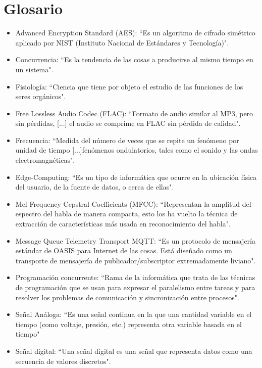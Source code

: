 \chapter{Glosario}
\begin{itemize}
    \item Advanced Encryption Standard (AES): ``Es un algoritmo de cifrado simétrico aplicado por NIST (Instituto Nacional de Estándares y Tecnología)"\cite{RFC3826}.
    \item Concurrencia: ``Es la tendencia de las cosas a producirse al mismo tiempo en un sistema"\cite{contconcurrency}.
    \item Fisiología: ``Ciencia que tiene por objeto el estudio de las funciones de los seres orgánicos"\cite{rae_2020}.
    \item Free Lossless Audio Codec (FLAC): ``Formato de audio similar al MP3, pero sin pérdidas, [...] el audio se comprime en FLAC sin pérdida de calidad"\cite{flac}.
    \item Frecuencia: ``Medida del número de veces que se repite un fenómeno por unidad de tiempo [...]fenómenos ondulatorios, tales como el sonido y las ondas electromagnéticas"\cite{euFrecuencia}.
    \item Edge-Computing: ``Es un tipo de informática que ocurre en la ubicación física del usuario, de la fuente de datos, o cerca de ellas"\cite{redHatEC2020}.
    \item Mel Frequency Cepstral Coefficients (MFCC): ``Representan la amplitud del espectro del habla de manera compacta, esto los ha vuelto la técnica de extracción de características más usada en reconocimiento del habla"\cite{MFCC}.
    \item Message Queue Telemetry Transport MQTT: ``Es un protocolo de mensajería estándar de OASIS para Internet de las cosas. Está diseñado como un transporte de mensajería de publicador/subscriptor extremadamente liviano"\cite{mqtt}.
    \item Programación concurrente: ``Rama de la informática que trata de las
    técnicas de programación que se usan para expresar el paralelismo entre tareas y para
    resolver los problemas de comunicación y sincronización entre procesos"\cite{concurrencia_2020}.
    \item Señal Análoga: ``Es una señal continua en la que una cantidad variable en el tiempo (como voltaje, presión, etc.) representa otra variable basada en el tiempo"\cite{arrowAnalogous}
    \item Señal digital: ``Una señal digital es una señal que representa datos como una secuencia de valores discretos"\cite{monloganalog}.

\end{itemize}
